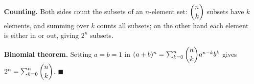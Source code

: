 \textbf{Counting.} Both sides count the subsets of an $n$-element set: $\dbinom nk$ subsets have $k$ elements, and summing over $k$ counts all subsets; on the other hand each element is either in or out, giving $2^n$ subsets.

\textbf{Binomial theorem.} Setting $a=b=1$ in $(a+b)^n=\sum_{k=0}^{n}\dbinom nk a^{n-k}b^k$ gives $2^n=\sum_{k=0}^{n}\dbinom nk$. $\blacksquare$
